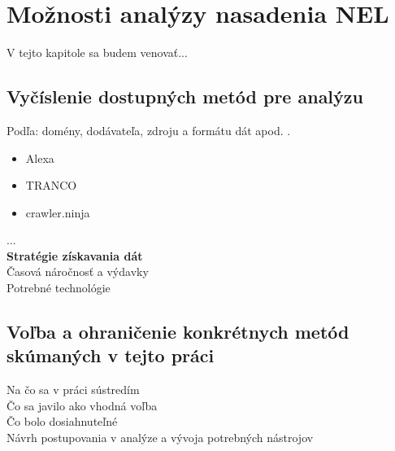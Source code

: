\chapter{Možnosti analýzy nasadenia NEL}
\label{possible-analysis-strategies}

V tejto kapitole sa budem venovať...


\section{Vyčíslenie dostupných metód pre analýzu}

Podľa: domény, dodávateľa, zdroju a formátu dát apod. \cite{automatic-js-restrictor-testing}.
\begin{itemize}
\item Alexa
\item TRANCO
\item crawler.ninja
\end{itemize}

...
\\
\textbf{Stratégie získavania dát}
\\
Časová náročnosť a výdavky
\\
Potrebné technológie

\section{Voľba a ohraničenie konkrétnych metód skúmaných v tejto práci}

Na čo sa v práci sústredím
\\
Čo sa javilo ako vhodná voľba
\\
Čo bolo dosiahnuteľné
\\
Návrh postupovania v analýze a vývoja potrebných nástrojov